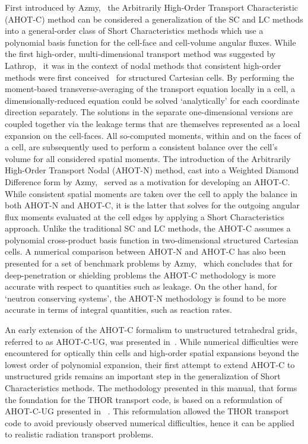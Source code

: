 First introduced by Azmy,~\cite{Azmy1992} the Arbitrarily High-Order Transport Characteristic (AHOT-C) method can be considered a generalization of the SC and LC methods into a general-order class of Short Characteristics methods which use a polynomial basis function for the cell-face and cell-volume angular fluxes. While the first high-order, multi-dimensional transport method was suggested by Lathrop,~\cite{Lathrop1969} it was in the context of nodal methods that consistent high-order methods were first conceived~\cite{Azmy1992} for structured Cartesian cells. By performing the moment-based transverse-averaging of the transport equation locally in a cell, a dimensionally-reduced equation could be solved ‘analytically’ for each coordinate direction separately. The solutions in the separate one-dimensional versions are coupled together via the leakage terms that are themselves represented as a local expansion on the cell-faces. All so-computed moments, within and on the faces of a cell, are subsequently used to perform a consistent balance over the cell's volume for all considered spatial moments. The introduction of the Arbitrarily High-Order Transport Nodal (AHOT-N) method, cast into a Weighted Diamond Difference form by Azmy,~\cite{Azmy1988a} served as a motivation for developing an AHOT-C. While consistent spatial moments are taken over the cell to apply the balance in both AHOT-N and AHOT-C, it is the latter that solves for the outgoing angular flux moments evaluated at the cell edges by applying a Short Characteristics approach. Unlike the traditional SC and LC methods, the AHOT-C assumes a polynomial cross-product basis function in two-dimensional structured Cartesian cells. A numerical comparison between AHOT-N and AHOT-C has also been presented for a set of benchmark problems by Azmy,~\cite{Azmy1992} which concludes that for deep-penetration or shielding problems the AHOT-C methodology is more accurate with respect to quantities such as leakage. On the other hand, for ‘neutron conserving systems’, the AHOT-N methodology is found to be more accurate in terms of integral quantities, such as reaction rates.

An early extension of the AHOT-C formalism to unstructured tetrahedral grids,  referred  to as AHOT-C-UG, was presented in~\cite{Azmy2001}. While numerical difficulties were encountered for optically thin cells and high-order spatial expansions beyond the lowest order of polynomial expansion, their first attempt to extend AHOT-C to unstructured grids remains an important step in the generalization of Short Characteristics methods. The methodology presented in this manual, that forms the foundation for the THOR transport code, is based on a reformulation of AHOT-C-UG presented in ~\cite{FerrerPhD}. This reformulation allowed the THOR transport code to avoid previously observed numerical difficulties, hence it can be applied to realistic radiation transport problems.